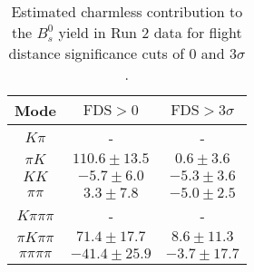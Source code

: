 \begin{table}[h]
  \centering
  \begin{tabular}{ccc}
      \toprule
      Mode & $\mathrm{FDS} > 0$ & $\mathrm{FDS} > 3\sigma$ \\
      \midrule
      $K\pi$ & \-- & \-- \\
      $\pi K$ & $110.6 \pm 13.5$ & $0.6 \pm 3.6$ \\
      $KK$ & $-5.7 \pm 6.0$ & $-5.3 \pm 3.6$ \\
      $\pi\pi$ & $3.3 \pm 7.8$ & $-5.0 \pm 2.5$ \\
      $K\pi\pi\pi$ & \-- & \-- \\
      $\pi K\pi\pi$ & $71.4 \pm 17.7$ & $8.6 \pm 11.3$ \\
      $\pi\pi\pi\pi$ & $-41.4 \pm 25.9$ & $-3.7 \pm 17.7$ \\
      \bottomrule
  \end{tabular}
  \caption{\small Estimated charmless contribution to the $B^{0}_{s}$ yield in Run 2 data for flight distance significance cuts of 0  and $3\sigma$.}
\label{tab:charmless_yields_Bs_run_2}
\end{table}
